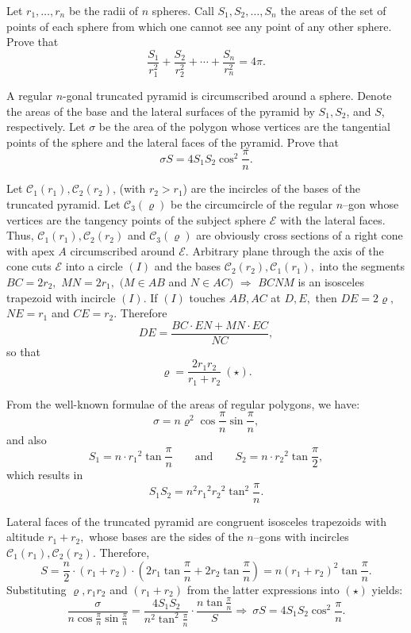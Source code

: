 \documentclass[12pt,a4paper]{memoir}
\theoremstyle{definition}
\begin{document}
\begin{question}[name={1982 IMO Longlist}]
	Let $r_1, \ldots , r_n$ be the radii of $n$ spheres. Call $S_1, S_2, \ldots , S_n$ the areas of the set of points of each sphere from which one cannot see any point of any other sphere. Prove that
	\[\frac{S_1}{r_1^2} + \frac{S_2}{r_2^2}+\cdots+\frac{S_n}{r_n^2} = 4 \pi.\]
\end{question}



\begin{question}[name={1982 IMO Longlist}]
	A regular $n$-gonal truncated pyramid is circumscribed around a sphere. Denote the areas of the base and the lateral surfaces of the pyramid by $S_1, S_2$, and $S$, respectively. Let $\sigma$ be the area of the polygon whose vertices are the tangential points of the sphere and the lateral faces of the pyramid. Prove that
	\[\sigma S = 4S_1S_2 \cos^2 \frac{\pi}{n}.\]
\end{question}

\begin{solution}[name={Solution by Luis González}]
	Let $\mathcal{C}_1(r_1),\mathcal{C}_2(r_2)$, (with $r_2 >r_1$) are the incircles of the bases of the truncated pyramid. Let $\mathcal{C}_3(\varrho)$ be the circumcircle of the regular $n$--gon whose vertices are the tangency points of the subject sphere $\mathcal{E}$ with the lateral faces. Thus, $\mathcal{C}_1(r_1),\mathcal{C}_2(r_2)$ and $\mathcal{C}_3(\varrho)$ are obviously cross sections of a right cone with apex $A$ circumscribed around $\mathcal{E}.$ Arbitrary plane through the axis of the cone cuts $\mathcal{E}$ into a circle $(I)$ and the bases $\mathcal{C}_2(r_2),\mathcal{C}_1(r_1) ,$ into the segments $BC=2r_2,$ $MN=2r_1,$ $(M \in AB$ and $N \in AC)$ $\Longrightarrow$ $BCNM$ is an isosceles trapezoid with incircle $(I).$ If $(I)$ touches $AB,AC$ at $D,E,$ then $DE=2\varrho, $ $NE=r_1$ and $CE=r_2.$ Therefore
	\[DE=\frac{BC \cdot EN+MN \cdot EC}{NC},\]
	so that \[\varrho= \frac{2r_1r_2}{r_1+r_2} \ (\star).\]
	
	From the well-known formulae of the areas of regular polygons, we have:
	$$\sigma=n\varrho^2\cos \frac{\pi}{n}\sin \frac{\pi}{n},$$
	and also
	$$S_1=n \cdot {r_1}^2\tan \frac{\pi}{n} \qquad \text{and} \qquad S_2=n \cdot {r_2}^2 \tan \frac{\pi}{2},$$
	which results in $$S_1S_2=n^2 {r_1}^2 {r_2}^2 \tan^2 \frac{\pi}{n}.$$
	
	Lateral faces of the truncated pyramid are congruent isosceles trapezoids with altitude $r_1+r_2,$ whose bases are the sides of the $n$--gons with incircles $\mathcal{C}_1(r_1),\mathcal{C}_2(r_2).$ Therefore,
	$$S=\frac{n}{2} \cdot (r_1+r_2) \cdot \left(2 r_1 \tan \frac{\pi}{n}+2 r_2 \tan \frac{\pi}{n} \right )=n(r_1+r_2)^2 \tan \frac{\pi}{n}.$$
	Substituting $\varrho, r_1r_2$ and $(r_1+r_2)$ from the latter expressions into $(\star)$ yields:
	$$\frac{\sigma}{n \cos \frac{\pi}{n} \sin \frac{\pi}{n}}=\frac{4S_1 S_2}{n^2 \tan^2 \frac{\pi}{n}} \cdot  \frac{n \tan \frac{\pi}{n}}{S} \Longrightarrow \ \sigma  S=4 S_1 S_2 \cos^2 \frac{\pi}{n}.$$
\end{solution}
\end{document}
